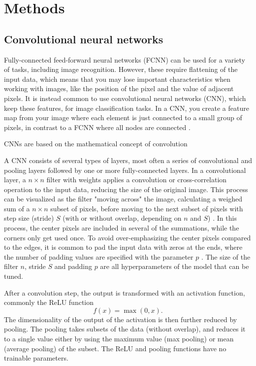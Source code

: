 \section{Methods}\label{sec:methods}

%

\subsection{Convolutional neural networks}

Fully-connected feed-forward neural networks (FCNN) can be used for a variety of tasks, including image recognition. However, these require flattening of the input data, which means that you may lose important characteristics when working with images, like the position of the pixel and the value of adjacent pixels. It is instead common to use convolutional neural networks (CNN), which keep these features, for image classification tasks. In a CNN, you create a feature map from your image where each element is just connected to a small group of pixels, in contrast to a FCNN where all nodes are connected \cite{raschka:2022:ml_pytorch_scikit}.

CNNs are based on the mathematical concept of convolution 

A CNN consists of several types of layers, most often a series of convolutional and pooling layers followed by one or more fully-connected layers. In a convolutional layer, a $n \times n$ filter with weights applies a convolution or cross-correlation operation to the input data, reducing the size of the original image. This process can be visualized as the filter "moving across" the image, calculating a weighed sum of a $n \times n$ subset of pixels, before moving to the next subset of pixels with step size (stride) $S$ (with or without overlap, depending on $n$ and $S$) \cite{dumoulin2016guide}. In this process, the center pixels are included in several of the summations, while the corners only get used once. To avoid over-emphasizing the center pixels compared to the edges, it is common to pad the input data with zeros at the ends, where the number of padding values are specified with the parameter $p$ \cite{raschka:2022:ml_pytorch_scikit}. The size of the filter $n$, stride $S$ and padding $p$ are all hyperparameters of the model that can be tuned.

After a convolution step, the output is transformed with an activation function, commonly the ReLU function
\begin{equation}
    f(x) = \max(0,x).
\end{equation}
The dimensionality of the output of the activation is then further reduced by pooling. The pooling takes subsets of the data (without overlap), and reduces it to a single value either by using the maximum value (max pooling) or mean (average pooling) of the subset. The ReLU and pooling functions have no trainable parameters.

